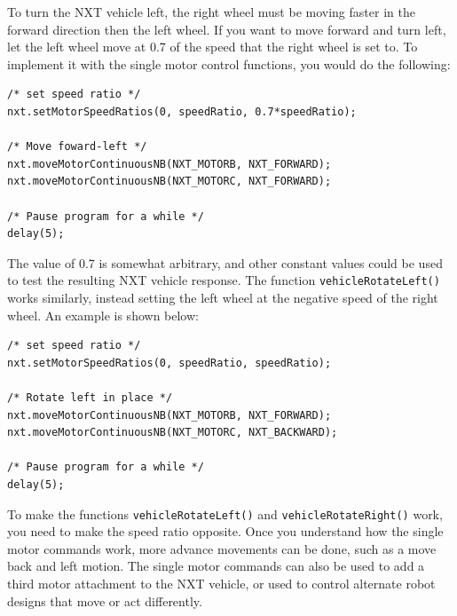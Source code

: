 \documentclass[11pt]{article}
\begin{document}
To turn the NXT vehicle left, the right wheel must be moving faster in the forward 
direction then the left wheel. If you want to move forward and turn left, let 
the left wheel move at 0.7 of the speed that the right wheel is set to. To 
implement it with the single motor control functions, you would do the following:
\begin{lstlisting}
/* set speed ratio */
nxt.setMotorSpeedRatios(0, speedRatio, 0.7*speedRatio);

/* Move foward-left */
nxt.moveMotorContinuousNB(NXT_MOTORB, NXT_FORWARD);
nxt.moveMotorContinuousNB(NXT_MOTORC, NXT_FORWARD);

/* Pause program for a while */
delay(5);
\end{lstlisting}
The value of 0.7 is somewhat arbitrary, and other constant values could be used 
to test the resulting NXT vehicle response. The function {\tt vehicleRotateLeft()} 
works similarly, instead setting the left wheel at the negative speed of the right 
wheel. An example is shown below:
\begin{lstlisting}
/* set speed ratio */
nxt.setMotorSpeedRatios(0, speedRatio, speedRatio);

/* Rotate left in place */
nxt.moveMotorContinuousNB(NXT_MOTORB, NXT_FORWARD);
nxt.moveMotorContinuousNB(NXT_MOTORC, NXT_BACKWARD);

/* Pause program for a while */
delay(5);
\end{lstlisting}
To make the functions {\tt vehicleRotateLeft()} and {\tt vehicleRotateRight()} work, 
you need to make the speed ratio opposite. Once you understand how the single motor 
commands work, more advance movements can be done, such as a move back and left motion. 
The single motor commands can also be used to add a third motor attachment to the NXT 
vehicle, or used to control alternate robot designs that move or act differently.\\
\end{document}
